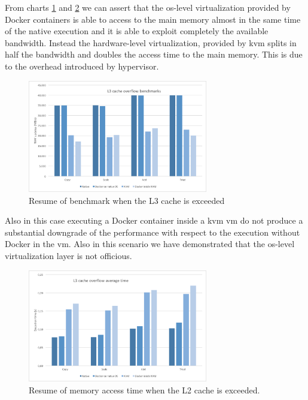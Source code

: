 From charts \ref{img:measurements-storage-results-l3Capacity} and \ref{img:measurements-storage-results-l3Time}
we can assert that the \acs{os}-level virtualization provided by Docker containers is able to access
to the main memory almost in the same time of the native execution and it is able to exploit completely
the available bandwidth. Instead the hardware-level virtualization, provided by \ac{kvm} splits in half
the bandwidth and doubles the access time to the main memory. This is due to the overhead introduced by
hypervisor.

\begin{figure}
	\centering{}
	\includegraphics[width=0.7\textwidth]{chapters/measurements/images/storage-l3-capacity.png}
	\caption[Storage - overflow L3 cache]{Resume of benchmark when the L3 cache is exceeded}
	\label{img:measurements-storage-results-l3Capacity}
\end{figure}

Also in this case executing a Docker container inside a \ac{kvm} \ac{vm} do not produce a substantial
downgrade of the performance with respect to the execution without Docker in the \ac{vm}. Also in this
scenario we have demonstrated that the \acs{os}-level virtualization layer is not officious.

\begin{figure}
	\centering{}
	\includegraphics[width=0.7\textwidth]{chapters/measurements/images/storage-l3-time.png}
	\caption[Storage - access time L2 cache exceeded]{Resume of memory access time when the L2
		cache is exceeded.}
	\label{img:measurements-storage-results-l3Time}
\end{figure}

